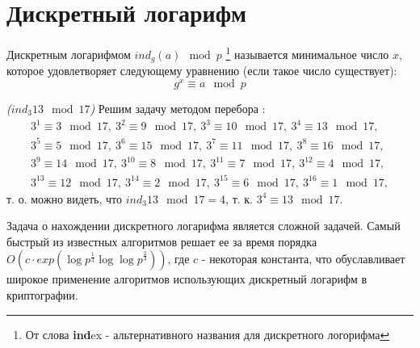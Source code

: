 \section{Дискретный логарифм}
\label{AddDiscretLog}
\begin{definition}
Дискретным логарифмом $ind_g\left(a\right) \mod{p}$
\footnote{От слова {\bf ind}ex - альтернативного названия для дискретного логорифма}
называется
минимальное число $x$, которое удовлетворяет следующему уравнению
(если такое число существует): 
\begin{equation}
g^x \equiv a \mod{p}
\nonumber
\end{equation}
\end{definition}

\begin{example}
\emph{($ind_3{13} \mod{17}$)}
Решим задачу методом перебора \cite{bWikiDiscretLog}:
\begin{eqnarray}
3^1 \equiv 3 \mod{17},\: 
3^2 \equiv 9 \mod{17},\: 
3^3 \equiv 10 \mod{17},\:
3^4 \equiv 13 \mod{17}, 
\nonumber \\
3^5 \equiv 5 \mod{17},\: 
3^6 \equiv 15 \mod{17},\: 
3^7 \equiv 11 \mod{17},\: 
3^8 \equiv 16 \mod{17}, 
\nonumber \\
3^9 \equiv 14 \mod{17},\: 
3^{10} \equiv 8 \mod{17},\: 
3^{11} \equiv 7 \mod{17},\: 
3^{12} \equiv 4 \mod{17}, 
\nonumber \\
3^{13} \equiv 12 \mod{17},\: 
3^{14} \equiv 2 \mod{17},\:
3^{15} \equiv 6 \mod{17},\: 
3^{16} \equiv 1 \mod{17},
\nonumber
\end{eqnarray}
т. о. можно видеть, что $ind_3{13} \mod{17} = 4$, 
т. к. $3^4 \equiv 13 \mod{17}$. 
\nonumber
\end{example}

Задача о нахождении дискретного логарифма является сложной
задачей. Самый быстрый из известных алгоритмов
\cite{bGordon93discretelogarithms} решает ее за время порядка 
\(
O\left(c \cdot
exp\left(\log{p}^{\frac{1}{3}}\log{\log{p}}^{\frac{2}{3}}
\right)\right)
\), где $c$ - некоторая константа,
что обуславливает широкое применение алгоритмов использующих
дискретный логарифм в криптографии.
